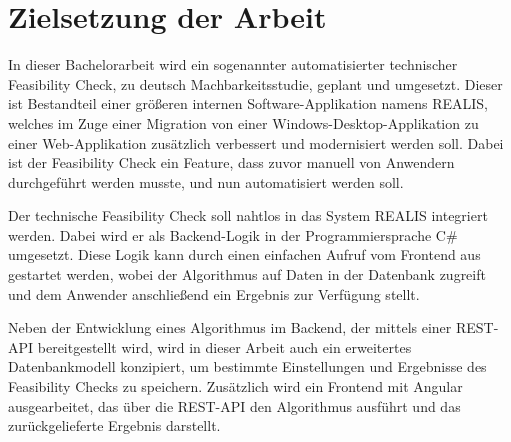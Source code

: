 \section{Zielsetzung der Arbeit}
In dieser Bachelorarbeit wird ein sogenannter automatisierter technischer Feasibility Check, zu deutsch Machbarkeitsstudie, geplant und umgesetzt. Dieser ist Bestandteil einer größeren internen Software-Applikation namens \gls{REALIS}, welches
im Zuge einer Migration von einer Windows-Desktop-Applikation zu einer Web-Applikation zusätzlich verbessert und modernisiert werden soll. Dabei ist der Feasibility Check ein Feature, dass zuvor manuell von Anwendern durchgeführt werden musste, und nun automatisiert werden soll.

Der technische Feasibility Check soll nahtlos in das System \gls{REALIS} integriert werden. Dabei wird er als Backend-Logik in der Programmiersprache C\# umgesetzt. Diese Logik kann durch einen einfachen Aufruf vom Frontend aus gestartet werden, wobei der Algorithmus auf Daten in der Datenbank zugreift und dem Anwender anschließend ein Ergebnis zur Verfügung stellt.

Neben der Entwicklung eines Algorithmus im Backend, der mittels einer REST-API bereitgestellt wird, wird in dieser Arbeit auch ein erweitertes Datenbankmodell konzipiert, um bestimmte Einstellungen und Ergebnisse des Feasibility Checks zu speichern. Zusätzlich wird ein Frontend mit Angular ausgearbeitet, das über die REST-API den Algorithmus ausführt und das zurückgelieferte Ergebnis darstellt.